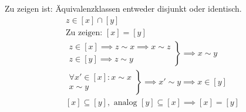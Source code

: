\begin{bew}
	Zu zeigen ist: Äquivalenzklassen entweder disjunkt oder identisch.\\
	\begin{gather*}
		z \in [x] \cap [y] \\
		\text{Zu zeigen: } [x] = [y] \\
		\left.\begin{array}{l}
			z \in [x] \implies z \sim x \implies x \sim z \\
			z \in [y] \implies z \sim y
		\end{array} \right\} \implies x \sim y \\
		\left.\begin{array}{l}
			\forall x' \in [x] : x \sim x \\
			x \sim y
		\end{array} \right\} \implies x' \sim y \implies x \in [y] \\
		[x] \subseteq [y], \text{ analog } [y] \subseteq [x] \implies [x] = [y] 
	\end{gather*}
\end{bew}
